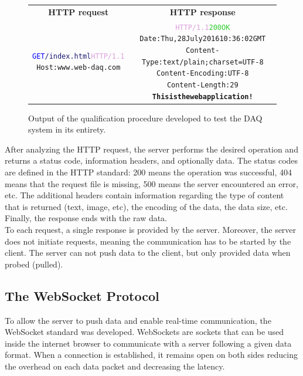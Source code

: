       \begin{figure}[h!]
        \begin{tabularx}{\textwidth}{C{1}C{1}}
          \textbf{HTTP request} & \textbf{HTTP response} \\
        { \footnotesize
\begin{alltt}
\textcolor{blue}{GET} \textcolor{MidnightBlue}{/index.html} \textcolor{Plum}{HTTP/1.1} \newline
Host: www.web-daq.com
\end{alltt} } & { \footnotesize
\begin{alltt}
\textcolor{Plum}{HTTP/1.1} \textcolor{LimeGreen}{200 OK} \newline
Date: Thu, 28 July 2016 10:36:02 GMT \newline
Content-Type: text/plain; charset=UTF-8 \newline
Content-Encoding: UTF-8 \newline
Content-Length: 29 \newline
\textbf{This is the web application !}
\end{alltt} }
        \end{tabularx}
        \caption{Output of the qualification procedure developed to test the DAQ system in its entirety.}
        \label{fig:III-2-http}
      \end{figure}

      After analyzing the HTTP request, the server performs the desired operation and returns a status code, information headers, and optionally data. The status codes are defined in the HTTP standard: 200 means the operation was successful, 404 means that the request file is missing, 500 means the server encountered an error, etc. The additional headers contain information regarding the type of content that is returned (text, image, etc), the encoding of the data, the data size, etc. Finally, the response ends with the raw data. \\

      To each request, a single response is provided by the server. Moreover, the server does not initiate requests, meaning the communication has to be started by the client. The server can not push data to the client, but only provided data when probed (pulled).

    \subsection{The WebSocket Protocol}

      To allow the server to push data and enable real-time communication, the WebSocket standard was developed. WebSockets are sockets that can be used inside the internet browser to communicate with a server following a given data format. When a connection is established, it remains open on both sides reducing the overhead on each data packet and decreasing the latency. \\

